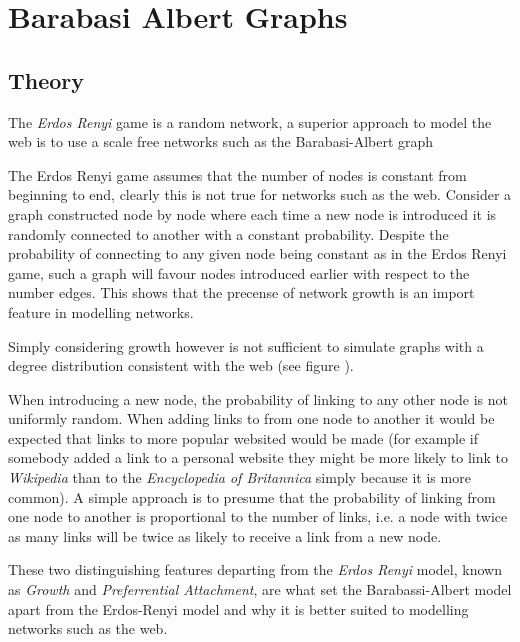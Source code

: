 \documentclass[11pt]{article}
\begin{document}
\section{Barabasi Albert Graphs}
\label{barabassi-albert}
\subsection{Theory}
\label{sec:org295fb32}

The \emph{Erdos Renyi} game is a random network, a superior approach to model the web
is to use a scale free networks \cite{barabasiPhysicsWeb2001} such as the
Barabasi-Albert graph \cite{barabasiScalefreeCharacteristicsRandom2000}

The Erdos Renyi game assumes that the number of nodes is constant from beginning
to end, clearly this is not true for networks such as the web. Consider a graph
constructed node by node where each time a new node is introduced it is randomly
connected to another with a constant probability. Despite the probability of
connecting to any given node being constant as in the Erdos Renyi game, such a
graph will favour nodes introduced earlier with respect to the number edges.
This shows that the precense of network growth is an import feature in modelling
networks.

Simply considering growth however is not sufficient to simulate graphs with a
degree distribution consistent with the web
\cite[Ch. 7]{zengPracticalSimulationMethod2013} (see figure ).

When introducing a new node, the probability of linking to any other node is not
uniformly random. When adding links to from one node to another it would be
expected that links to more popular websited would be made (for example if
somebody added a link to a personal website they might be more likely to link to
\emph{Wikipedia} than to the \emph{Encyclopedia of Britannica} simply because it is more
common). A simple approach is to presume that the probability of linking from
one node to another is proportional to the number of links, i.e. a node with
twice as many links will be twice as likely to receive a link from a new node.

These two distinguishing features departing from the \emph{Erdos Renyi} model, known as \emph{Growth} and \emph{Preferrential Attachment}, are what set the Barabassi-Albert model apart from the Erdos-Renyi model and why it is better suited to modelling networks such as the web. \cite[Ch. 7]{barabasiLinkedNewScience2002}
\end{document}
